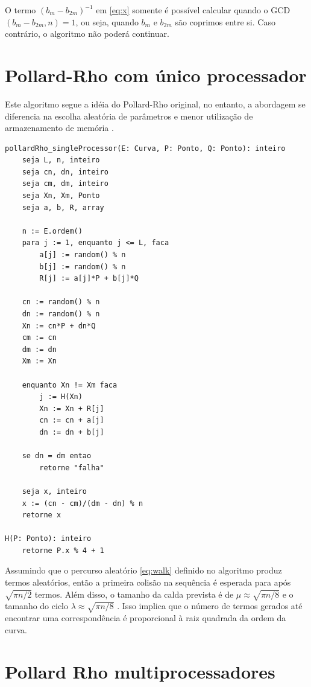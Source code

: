 O termo $(b_m - b_{2m})^{-1}$ em \ref{eq:x} somente é possível calcular quando o GCD$(b_m - b_{2m}, n) = 1$, ou seja, quando \(b_m\) e \(b_{2m}\) são coprimos entre si. Caso contrário, o algoritmo não poderá continuar.

\section{Pollard-Rho com único processador}
Este algoritmo segue a idéia do Pollard-Rho original, no entanto, a abordagem se diferencia na escolha aleatória de parâmetros e menor utilização de armazenamento de memória \cite{Guide}.


\begin{lstlisting}[caption={Algoritmo Pollard-Rho com único processador.},label=single]
pollardRho_singleProcessor(E: Curva, P: Ponto, Q: Ponto): inteiro
	seja L, n, inteiro
	seja cn, dn, inteiro
	seja cm, dm, inteiro
	seja Xn, Xm, Ponto
	seja a, b, R, array

	n := E.ordem()
	para j := 1, enquanto j <= L, faca
		a[j] := random() % n
		b[j] := random() % n
		R[j] := a[j]*P + b[j]*Q

	cn := random() % n
	dn := random() % n
	Xn := cn*P + dn*Q
	cm := cn
	dm := dn
	Xm := Xn

	enquanto Xn != Xm faca
		j := H(Xn)
		Xn := Xn + R[j]
		cn := cn + a[j]
		dn := dn + b[j]

	se dn = dm entao
		retorne "falha"

	seja x, inteiro
	x := (cn - cm)/(dm - dn) % n
	retorne x

H(P: Ponto): inteiro
	retorne P.x % 4 + 1

\end{lstlisting}

Assumindo que o percurso aleatório \ref{eq:walk} definido no algoritmo produz termos aleatórios, então a primeira colisão na sequência é esperada para após $\sqrt{\pi n/2}$ termos. Além disso, o tamanho da calda prevista é de $\mu \approx \sqrt{\pi n/8}$ e o tamanho do ciclo $\lambda \approx \sqrt{\pi n/8}$ \cite{Pollard:1978}. Isso implica que o número de termos gerados até encontrar uma correspondência é proporcional à raiz quadrada da ordem da curva.

%
%
\section{Pollard Rho multiprocessadores}

